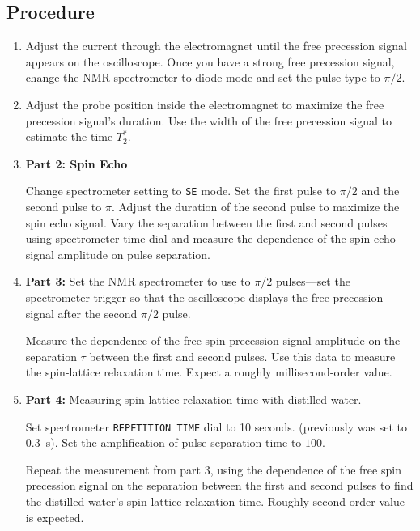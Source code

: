 \documentclass[11pt, a4paper]{article}
\begin{document}
\subsection{Procedure}
\begin{enumerate}
	\item Adjust the current through the electromagnet until the free precession signal appears on the oscilloscope. Once you have a strong free precession signal, change the NMR spectrometer to diode mode and set the pulse type to $ \pi/2 $.
		
	\item Adjust the probe position inside the electromagnet to maximize the free precession signal's duration. Use the width of the free precession signal to estimate the time $ T_{2}^{*} $.
		
	\item \textbf{Part 2: Spin Echo}
	
	Change spectrometer setting to \texttt{SE} mode. Set the first pulse to $ \pi/2 $ and the second pulse to $ \pi $. Adjust the duration of the second pulse to maximize the spin echo signal. Vary the separation between the first and second pulses using spectrometer time dial and measure the dependence of the spin echo signal amplitude on pulse separation.
		
	\item \textbf{Part 3:} Set the NMR spectrometer to use to $ \pi/2 $ pulses---set the spectrometer trigger so that the oscilloscope displays the free precession signal after the second $ \pi/2 $ pulse.
	
	Measure the dependence of the free spin precession signal amplitude on the separation $ \tau $ between the first and second pulses. Use this data to measure the spin-lattice relaxation time. Expect a roughly millisecond-order value.
	
	\item \textbf{Part 4: } Measuring spin-lattice relaxation time with distilled water. 
	
	Set spectrometer \texttt{REPETITION TIME} dial to 10 seconds. (previously was set to \SI{0.3}{\second}). Set the amplification of pulse separation time to $ 100 $. 
	
	Repeat the measurement from part 3, using the dependence of the free spin precession signal on the separation between the first and second pulses to find the distilled water's  spin-lattice relaxation time. 
	Roughly second-order value is expected. 
\end{enumerate}
\end{document}
